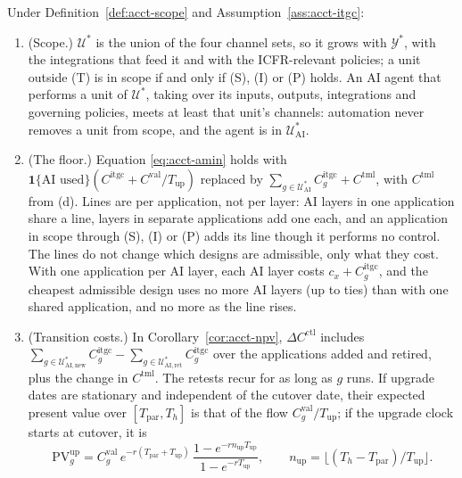 \begin{proposition}\label{prop:acct-itgc}
Under Definition~\ref{def:acct-scope} and Assumption~\ref{ass:acct-itgc}:
\begin{enumerate}
\item[(a)] (Scope.) $\mathcal U^*$ is the union of the four channel sets, so it grows with $\mathcal Y^*$, with the integrations that feed it and with the ICFR-relevant policies; a unit outside (T) is in scope if and only if (S), (I) or (P) holds. An AI agent that performs a unit of $\mathcal U^*$, taking over its inputs, outputs, integrations and governing policies, meets at least that unit's channels: automation never removes a unit from scope, and the agent is in $\mathcal U^*_{\mathrm{AI}}$.
\item[(b)] (The floor.) Equation \eqref{eq:acct-amin} holds with $\mathbf 1\{\text{AI used}\}(C^{\mathrm{itgc}}+C^{\mathrm{val}}/T_{\mathrm{up}})$ replaced by $\sum_{g\in\mathcal U^*_{\mathrm{AI}}}C^{\mathrm{itgc}}_g+C^{\mathrm{tml}}$, with $C^{\mathrm{tml}}$ from (d). Lines are per application, not per layer: AI layers in one application share a line, layers in separate applications add one each, and an application in scope through (S), (I) or (P) adds its line though it performs no control. The lines do not change which designs are admissible, only what they cost. With one application per AI layer, each AI layer costs $c_x+C^{\mathrm{itgc}}_g$, and the cheapest admissible design uses no more AI layers (up to ties) than with one shared application, and no more as the line rises.
\item[(c)] (Transition costs.) In Corollary~\ref{cor:acct-npv}, $\Delta C^{\mathrm{ctl}}$ includes $\sum_{g\in\mathcal U^*_{\mathrm{AI},\mathrm{new}}}C^{\mathrm{itgc}}_g-\sum_{g\in\mathcal U^*_{\mathrm{AI},\mathrm{ret}}}C^{\mathrm{itgc}}_g$ over the applications added and retired, plus the change in $C^{\mathrm{tml}}$. The retests recur for as long as $g$ runs. If upgrade dates are stationary and independent of the cutover date, their expected present value over $[T_{\mathrm{par}},T_h]$ is that of the flow $C^{\mathrm{val}}_g/T_{\mathrm{up}}$; if the upgrade clock starts at cutover, it is
\begin{equation}\label{eq:acct-pvup}
\mathrm{PV}^{\mathrm{up}}_g=C^{\mathrm{val}}_g\,e^{-r(T_{\mathrm{par}}+T_{\mathrm{up}})}\,\frac{1-e^{-rn_{\mathrm{up}}T_{\mathrm{up}}}}{1-e^{-rT_{\mathrm{up}}}},\qquad n_{\mathrm{up}}=\bigl\lfloor(T_h-T_{\mathrm{par}})/T_{\mathrm{up}}\bigr\rfloor .
\end{equation}

\end{enumerate}
\end{proposition}
